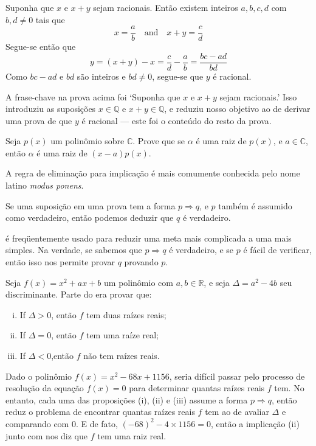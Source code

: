 \begin{estratégia}
\begin{cproof}
Suponha que $x$ e $x+y$ sejam racionais. Então existem inteiros $a,b,c,d$ com $b,d \ne 0$ tais que
\[
x = \frac{a}{b} \quad \text{and} \quad x+y = \frac{c}{d}
\]
Segue-se então que
\[
y = (x+y)-x = \frac{c}{d}-\frac{a}{b} = \frac{bc-ad}{bd}
\]
Como $bc-ad$ e $bd$ são inteiros e $bd \ne 0$, segue-se que $y$ é racional.
\end{cproof}

A frase-chave na prova acima foi `Suponha que $x$ e $x+y$ sejam racionais.' Isso introduziu as suposições $x \in \mathbb{Q}$ e $x+y \in \mathbb{Q}$, e reduziu nosso objetivo ao de derivar uma prova de que $y$ é racional --- este foi o conteúdo do resto da prova.

\begin{exercise}
Seja $p(x)$ um polinômio sobre $\mathbb{C}$. Prove que se $\alpha$ é uma raiz de $p(x)$, e $a \in \mathbb{C}$, então $\alpha$ é uma raiz de $(x-a)p(x)$.
\end{exercise}

A regra de eliminação para implicação \elimrule{\Rightarrow} é mais comumente conhecida pelo nome latino \textit{modus ponens}.

\begin{strategy}
\label{strAssumingImplicationsDirect}
Se uma suposição em uma prova tem a forma $p \Rightarrow q$, e $p$ também é assumido como verdadeiro, então podemos deduzir que $q$ é verdadeiro.
\end{strategy}

 é freqüentemente usado para reduzir uma meta mais complicada a uma mais simples. Na verdade, se sabemos que $p \Rightarrow q$ é verdadeiro, e se $p$ é fácil de verificar, então isso nos permite provar $q$ provando $p$.

\begin{example}
Seja $f(x) = x^2+ax+b$ um polinômio com $a,b \in \mathbb{R}$, e seja $\Delta = a^2-4b$ seu discriminante. Parte do  era provar que:
\begin{enumerate}[(i)]
\item If $\Delta > 0$, então $f$ tem duas raízes reais;
\item If $\Delta = 0$, então $f$ tem uma raíze real;
\item If $\Delta < 0$,então $f$ não tem raízes reais.
\end{enumerate}
Dado o polinômio $f(x) = x^2-68x+1156$, seria difícil passar pelo processo de resolução da equação $f(x)=0$ para determinar quantas raízes reais $f $ tem. No entanto, cada uma das proposições (i), (ii) e (iii) assume a forma $p \Rightarrow q$, então  reduz o problema de encontrar quantas raízes reais $f$ tem ao de avaliar $\Delta$ e comparando com $0$. E de fato, $(-68)^2 - 4 \times 1156 = 0$, então a implicação (ii) junto com \elimrule{\Rightarrow} nos diz que $f$ tem uma raiz real.
\end{example}


\end{estratégia}

